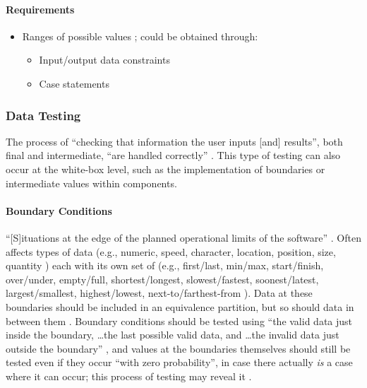\paragraph{Requirements}
\begin{itemize}
      \item Ranges of possible values \cite[p.~67]{patton_software_2006};
            could be obtained through:
            \begin{itemize}
                  \item Input/output data constraints
                  \item Case statements
            \end{itemize}
\end{itemize}

\subsubsection{Data Testing \cite[p.~70-79]{patton_software_2006}}

The process of ``checking that information the user inputs [and] results'',
both final and intermediate, ``are handled correctly''
\cite[p.~70]{patton_software_2006}. This type of testing can also occur at the
white-box level, such as the implementation of boundaries
\cite[p.~431]{van_vliet_software_2000} or intermediate values within
components.

\paragraph{Boundary Conditions \cite[p.~70-74]{patton_software_2006}}

``[S]ituations at the edge of the planned operational limits of the software''
\cite[p.~72]{patton_software_2006}. Often affects types of data (e.g., numeric,
speed, character, location, position, size, quantity
\cite[p.~72]{patton_software_2006}) each with its own set of (e.g., first/last,
min/max, start/finish, over/under, empty/full, shortest/longest,
slowest/fastest, soonest/latest, largest/smallest, highest/lowest,
next-to/farthest-from \cite[p.~72-73]{patton_software_2006}). Data at these
boundaries should be included in an equivalence partition, but so should
data in between them \cite[p.~73]{patton_software_2006}. Boundary conditions
should be tested using ``the valid data just inside the boundary,
\dots the last possible valid data, and \dots the invalid data just outside the
boundary'' \cite[p.~73]{patton_software_2006}, and values at the boundaries
themselves should still be tested even if they occur ``with zero probability'',
in case there actually \emph{is} a case where it can occur; this process of
testing may reveal it \cite[p.~460]{peters_software_2000}.

